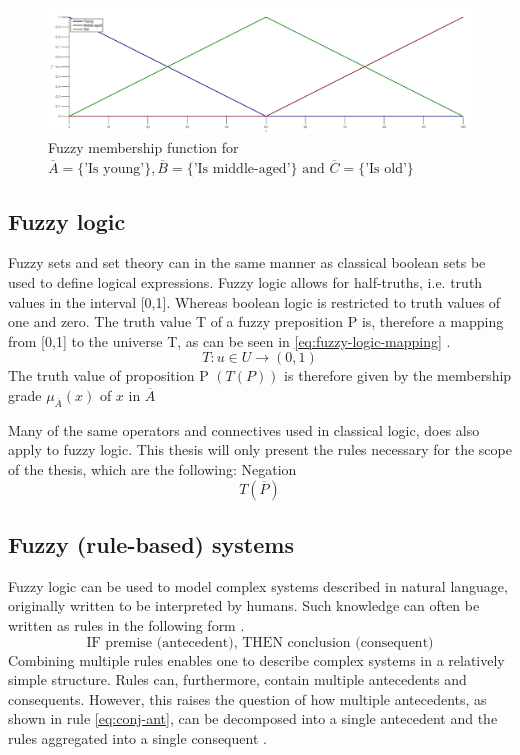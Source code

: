 \begin{figure}
    \centering
    \includegraphics[width=\textwidth]{FMF_ex2}
    \caption{Fuzzy membership function for $\overbar{A}=\{\text{'Is young'}\}, \overbar{B}=\{\text{'Is middle-aged'\}}\text{ and }\overbar{C}=\{\text{'Is old'\}}$}
    \label{fig:FMF_ex2}
\end{figure}

\subsection{Fuzzy logic}
Fuzzy sets and set theory can in the same manner as classical boolean sets be used to define logical expressions. Fuzzy logic allows for half-truths, i.e. truth values in the interval [0,1]. Whereas boolean logic is restricted to truth values of one and zero. The truth value T of a fuzzy preposition P is, therefore a mapping from [0,1] to the universe T, as can be seen in \ref{eq:fuzzy-logic-mapping} \cite{ross2009fuzzy}.
\begin{equation}
    T:u\in U\rightarrow (0,1)
    \label{eq:fuzzy-logic-mapping}
\end{equation}
The truth value of proposition P $(T(P))$ is therefore given by the membership grade $\mu_{\overbar{A}}(x)$ of $x$ in $\overbar{A}$

Many of the same operators and connectives used in classical logic, does also apply to fuzzy logic. This thesis will only present the rules necessary for the scope of the thesis, which are the following:
Negation
\begin{equation}
    T(\overbar{P})
\end{equation}

\subsection{Fuzzy (rule-based) systems}
Fuzzy logic can be used to model complex systems described in natural language, originally written to be interpreted by humans. Such knowledge can often be written as rules in the following form \cite{ross2009fuzzy}.
\begin{equation}
    \text{IF premise (antecedent), THEN conclusion (consequent)}
\end{equation}
Combining multiple rules enables one to describe complex systems in a relatively simple structure. Rules can, furthermore, contain multiple antecedents and consequents. However, this raises the question of how multiple antecedents, as shown in rule \ref{eq:conj-ant}, can be  decomposed into a single antecedent and the rules aggregated into a single consequent \cite{ross2009fuzzy}.

